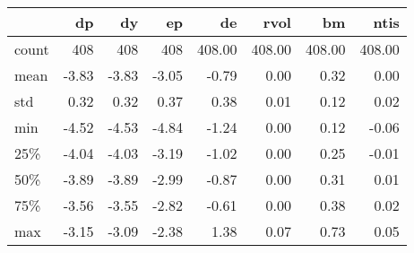 \begin{tabular}{lrrrrrrr}
  \toprule
  {} &    dp &    dy &    ep &    de &  rvol &    bm &  ntis \\
  \midrule
  count &  408 &  408 &  408 &  408.00 &  408.00 &  408.00 &  408.00 \\
  mean  &   -3.83 &   -3.83 &   -3.05 &   -0.79 &    0.00 &    0.32 &    0.00 \\
  std   &    0.32 &    0.32 &    0.37 &    0.38 &    0.01 &    0.12 &    0.02 \\
  min   &   -4.52 &   -4.53 &   -4.84 &   -1.24 &    0.00 &    0.12 &   -0.06 \\
  25\%   &   -4.04 &   -4.03 &   -3.19 &   -1.02 &    0.00 &    0.25 &   -0.01 \\
  50\%   &   -3.89 &   -3.89 &   -2.99 &   -0.87 &    0.00 &    0.31 &    0.01 \\
  75\%   &   -3.56 &   -3.55 &   -2.82 &   -0.61 &    0.00 &    0.38 &    0.02 \\
  max   &   -3.15 &   -3.09 &   -2.38 &    1.38 &    0.07 &    0.73 &    0.05 \\
  \bottomrule
  \end{tabular}